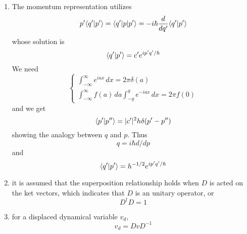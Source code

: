 \begin{enumerate}
	\item The momentum representation utilizes
	\begin{equation}
	p'\langle q' | p' \rangle = \langle q' | p | p' \rangle = -i\hbar \frac{d}{dq'} \langle q' | p' \rangle
	\end{equation}
	whose solution is
	\begin{equation}
	\langle q' | p' \rangle=c' e^{ip'q'/\hbar}
	\end{equation}
	We need
	\begin{equation}
	\begin{cases}
	\int_{-\infty}^{\infty} e^{iax} \, dx = 2\pi \delta(a)\\
	\int_{-\infty}^{\infty} f(a)\,da \int_{-g}^g e^{-iax} \, dx = 2\pi f(0)
	\end{cases}
	\end{equation}
	and we get
	\begin{equation}
	\langle p' | p'' \rangle = |c'|^2h\delta(p'-p'')
	\end{equation}
	showing the analogy between $q$ and $p$. Thus
	\begin{equation}
	q=i\hbar d/dp
	\end{equation}
	and
	\begin{equation}
	\langle q' | p' \rangle= h^{-1/2}e^{ip'q'/\hbar}
	\end{equation}

	\item it is assumed that the superposition relationship holds when $D$ is acted on the ket vectors, which indicates that $D$ is an unitary operator, or
	\begin{equation}
	D^\dagger D = 1
	\end{equation}

	\item for a displaced dynamical variable $v_d$,
	\begin{equation}
	v_d=DvD^{-1}
	\end{equation}


\end{enumerate}
